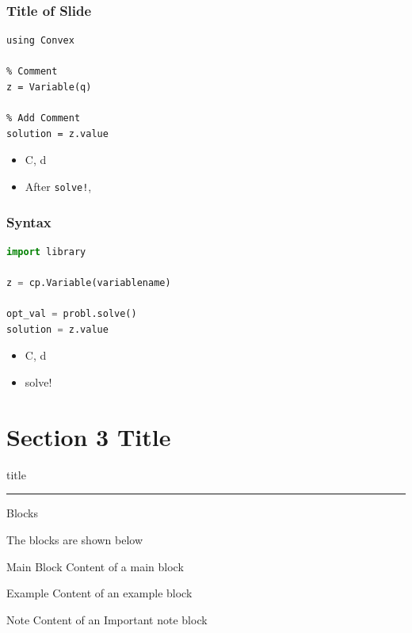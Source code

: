 \documentclass{beamer} %
\begin{document}
\begin{frame}[fragile]
    \frametitle{Title of Slide}%
    \vspace{-10pt}
    \begin{verbatim}
using Convex

% Comment
z = Variable(q)

% Add Comment
solution = z.value
\end{verbatim}
   
    \begin{itemize}
    \color{red}
        \item C, d
        \item After \texttt{solve!}, 
        
    \end{itemize}
\end{frame}
\begin{frame}[fragile]
  \frametitle{Syntax}
  \begin{lstlisting}[language=Python,basicstyle = \normalsize\ttfamily,]
import library

z = cp.Variable(variablename)

opt_val = probl.solve()
solution = z.value
  \end{lstlisting}
\begin{itemize}
\color{red}
   \item  C, d
    \item solve! 
\end{itemize}
\end{frame}

\section{\textbf{Section 3 Title}}
    \begin{frame}[plain]
        \vfill
      \centering
      \begin{beamercolorbox}[sep=8pt,center,shadow=true,rounded=true]{title}
        \insertsectionhead\par%
        \color{red}\noindent\rule{10cm}{1pt}
      \end{beamercolorbox}
      \vfill
  \end{frame}
  
\begin{frame}[c]{Blocks}
	
The blocks are shown below
\begin{block}{Main Block}
	Content of a main block
\end{block}

\begin{exampleblock}{Example}
	Content of an example block
\end{exampleblock}

\begin{alertblock}{Note}
	Content of an Important note block
\end{alertblock}

\end{frame}	
\end{document}
